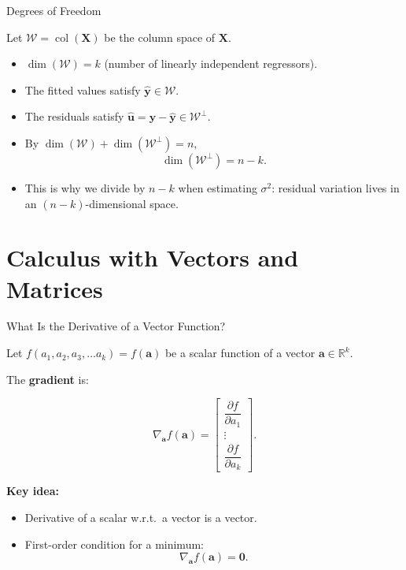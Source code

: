 \documentclass[aspectratio=169, handout, t]{beamer}
\DeclareMathOperator{\col}{col}
\numberwithin{equation}{section}
\begin{document}
\begin{frame}{Degrees of Freedom}

Let $\mathcal{W}=\col(\bm{X})$ be the column space of $\bm{X}$.

\begin{itemize}
    \item $\dim(\mathcal{W})=k$ (number of linearly independent regressors).\pause
    \item The fitted values satisfy $\hat{\bm{y}}\in\mathcal{W}$.\pause
    \item The residuals satisfy $\hat{\bm{u}}=\bm{y}-\hat{\bm{y}}\in \mathcal{W}^{\perp}$.\pause
    \item By $\dim(\mathcal{W})+\dim(\mathcal{W}^{\perp})=n$,
    \[
    \dim(\mathcal{W}^{\perp})=n-k.
    \]\pause
    \item This is why we divide by $n-k$ when estimating $\sigma^2$:
    residual variation lives in an $(n-k)$-dimensional space.
\end{itemize}

\end{frame}
\section[Vector Calculus]{Calculus with Vectors and Matrices}

\begin{frame}{What Is the Derivative of a Vector Function?}

Let $f(a_1, a_2, a_3, \ldots a_k)=f(\bm{a})$ be a scalar function of a vector
$\bm{a} \in \mathbb{R}^k$.

\vspace{0.3cm}

The \textbf{gradient} is:

\[
\nabla_{\bm{a}} f(\bm{a})
=
\begin{bmatrix}
\dfrac{\partial f}{\partial a_1} \\
\vdots \\
\dfrac{\partial f}{\partial a_k}
\end{bmatrix}.
\]

\vspace{0.4cm}

\textbf{Key idea:}\pause

\begin{itemize}
    \item Derivative of a scalar w.r.t.\ a vector is a vector.\pause
    \item First-order condition for a minimum:
    \[
    \nabla_{\bm{a}} f(\bm{a}) = \bm{0}.
    \]
\end{itemize}

\end{frame}
\end{document}

